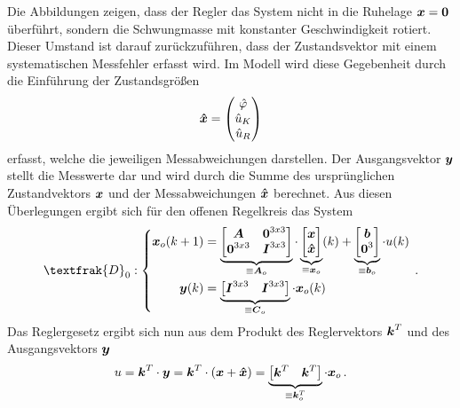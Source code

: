 Die Abbildungen zeigen, dass der Regler das System nicht in die Ruhelage $\boldsymbol{x}=\boldsymbol{0}$ überführt, sondern die Schwungmasse mit konstanter Geschwindigkeit rotiert. Dieser Umstand ist darauf zurückzuführen, dass der Zustandsvektor mit einem systematischen Messfehler erfasst wird. Im Modell wird diese Gegebenheit durch die Einführung der Zustandsgrößen
\begin{equation}
\boldsymbol{\hat{x}} = \begin{pmatrix}
\hat{\varphi} \\ \hat{u}_K \\ \hat{u}_R
\end{pmatrix}
\end{equation}
erfasst, welche die jeweiligen Messabweichungen darstellen. Der Ausgangsvektor $\boldsymbol{y}$ stellt die Messwerte dar und wird durch die Summe des ursprünglichen Zustandvektors $\boldsymbol{x}$ und der Messabweichungen $\boldsymbol{\hat{x}}$ berechnet. Aus diesen Überlegungen ergibt sich für den offenen Regelkreis das System
\begin{equation}
\textfrak{D}_0 : \left\{ \begin{split}
\bs{x}_o(k+1) &= \underbrace{\begin{bmatrix}
\bs{A} & \bs{0}^{3x3} \\ \bs{0}^{3x3} & \bs{I}^{3x3}\end{bmatrix}}_{\equiv \bs{A}_o}\cdot \underbrace{\begin{bmatrix}
\bs{x} \\ \bs{\hat{x}}
\end{bmatrix}}_{\equiv \bs{x}_o}(k) + \underbrace{\begin{bmatrix}
\bs{b} \\ \bs{0}^3 \end{bmatrix}}_{\equiv \bs{b}_o} \cdot u(k)
\\
\bs{y}(k) &= \underbrace{\begin{bmatrix}
\bs{I}^{3x3} & \bs{I}^{3x3}\end{bmatrix}}_{\equiv \bs{C}_o}\cdot \bs{x}_o(k)
\end{split}
\right. \,.
\end{equation}
Das Reglergesetz ergibt sich nun aus dem Produkt des Reglervektors $\boldsymbol{k}^T$ und des Ausgangsvektors $\boldsymbol{y}$
\begin{equation}
u = \boldsymbol{k}^T\cdot \boldsymbol{y} = \boldsymbol{k}^T \cdot (\boldsymbol{x} + \boldsymbol{\hat{x}}) = \underbrace{\begin{bmatrix}
\boldsymbol{k}^T & \boldsymbol{k}^T
\end{bmatrix}}_{\equiv \boldsymbol{k}^T_o} \cdot \boldsymbol{x}_o \,.
\end{equation}
